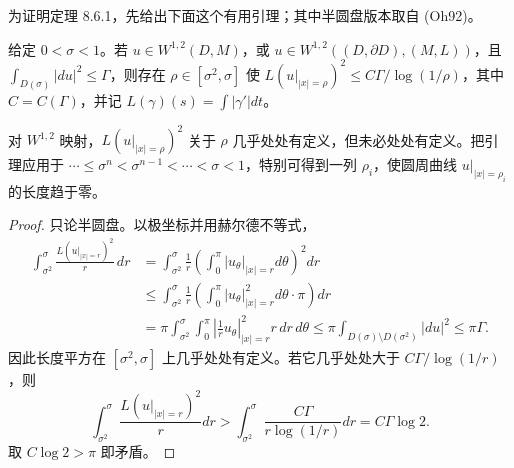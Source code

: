 为证明定理 8.6.1，先给出下面这个有用引理；其中半圆盘版本取自 (Oh92)。
\begin{lemma}[库朗--勒贝格]\label{lem:ch8-courant-lebesgue}\leavevmode\par
{}
给定 $0<\sigma<1$。若 $u\in W^{1,2}(D,M)$，或
$u\in W^{1,2}((D,\partial D),(M,L))$，且
$\int_{D(\sigma)}|du|^2\leq\Gamma$，则存在 $\rho\in[\sigma^2,\sigma]$ 使
$L(u|_{|x|=\rho})^2\leq C\Gamma/\log(1/\rho)$，其中 $C=C(\Gamma)$，并记
$L(\gamma)(s)=\int|\gamma'|dt$。
\end{lemma}
对 $W^{1,2}$ 映射，$L(u|_{|x|=\rho})^2$ 关于 $\rho$ 几乎处处有定义，但未必处处有定义。把引理应用于
$\cdots\leq\sigma^n<\sigma^{n-1}<\cdots<\sigma<1$，特别可得到一列
$\rho_i$，使圆周曲线 $u|_{|x|=\rho_i}$ 的长度趋于零。
\begin{proof}
只论半圆盘。以极坐标并用赫尔德不等式，
\begin{align*}
 \int_{\sigma^2}^{\sigma}\frac{L(u|_{|x|=r})^2}{r}\,dr
 &=\int_{\sigma^2}^{\sigma}\frac1r
 \left(\int_0^\pi\left|u_\theta\right|_{|x|=r}d\theta\right)^2dr\\
 &\leq\int_{\sigma^2}^{\sigma}\frac1r
 \left(\int_0^\pi|u_\theta|^2_{|x|=r}d\theta\cdot\pi\right)dr\\
 &=\pi\int_{\sigma^2}^{\sigma}\int_0^\pi
 \left|\frac1r u_\theta\right|^2_{|x|=r}r\,dr\,d\theta
 \leq\pi\int_{D(\sigma)\setminus D(\sigma^2)}|du|^2\leq\pi\Gamma.
\end{align*}
因此长度平方在 $[\sigma^2,\sigma]$ 上几乎处处有定义。若它几乎处处大于
$C\Gamma/\log(1/r)$，则
\[
 \int_{\sigma^2}^{\sigma}\frac{L(u|_{|x|=r})^2}{r}dr
 >\int_{\sigma^2}^{\sigma}\frac{C\Gamma}{r\log(1/r)}dr=C\Gamma\log2.
\]
取 $C\log2>\pi$ 即矛盾。
\end{proof}


